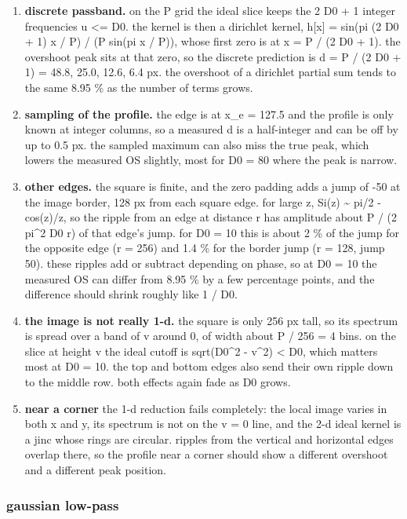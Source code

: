 \begin{enumerate}
\item \textbf{discrete passband.} on the P grid the ideal slice keeps the 2 D0 + 1 integer frequencies \textbar{}u\textbar{} \textless{}= D0. the kernel is then a dirichlet kernel, h[x] = sin(pi (2 D0 + 1) x / P) / (P sin(pi x / P)), whose first zero is at x = P / (2 D0 + 1). the overshoot peak sits at that zero, so the discrete prediction is d = P / (2 D0 + 1) = 48.8, 25.0, 12.6, 6.4 px. the overshoot of a dirichlet partial sum tends to the same 8.95 \% as the number of terms grows.
\item \textbf{sampling of the profile.} the edge is at x\_e = 127.5 and the profile is only known at integer columns, so a measured d is a half-integer and can be off by up to 0.5 px. the sampled maximum can also miss the true peak, which lowers the measured OS slightly, most for D0 = 80 where the peak is narrow.
\item \textbf{other edges.} the square is finite, and the zero padding adds a jump of -50 at the image border, 128 px from each square edge. for large z, Si(z) \textasciitilde{} pi/2 - cos(z)/z, so the ripple from an edge at distance r has amplitude about P / (2 pi\textasciicircum{}2 D0 r) of that edge's jump. for D0 = 10 this is about 2 \% of the jump for the opposite edge (r = 256) and 1.4 \% for the border jump (r = 128, jump 50). these ripples add or subtract depending on phase, so at D0 = 10 the measured OS can differ from 8.95 \% by a few percentage points, and the difference should shrink roughly like 1 / D0.
\item \textbf{the image is not really 1-d.} the square is only 256 px tall, so its spectrum is spread over a band of v around 0, of width about P / 256 = 4 bins. on the slice at height v the ideal cutoff is sqrt(D0\textasciicircum{}2 - v\textasciicircum{}2) \textless{} D0, which matters most at D0 = 10. the top and bottom edges also send their own ripple down to the middle row. both effects again fade as D0 grows.
\item \textbf{near a corner} the 1-d reduction fails completely: the local image varies in both x and y, its spectrum is not on the v = 0 line, and the 2-d ideal kernel is a jinc whose rings are circular. ripples from the vertical and horizontal edges overlap there, so the profile near a corner should show a different overshoot and a different peak position.
\end{enumerate}

\subsubsection*{gaussian low-pass}

